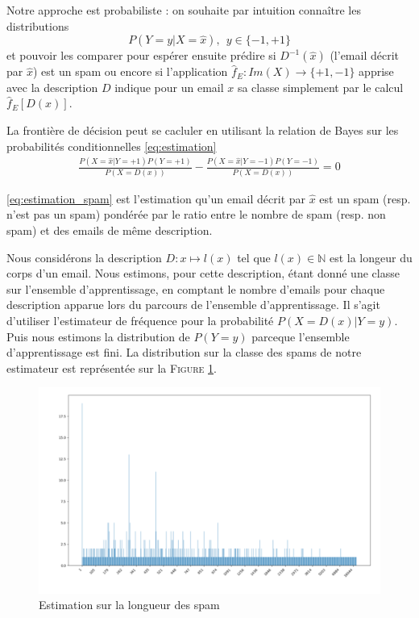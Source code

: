 \documentclass[a4paper, french]{article}
\begin{document}
Notre approche est probabiliste : on souhaite par intuition conna\^itre les distributions 
\label{eq:estimation}
\begin{equation}P(Y=y|X=\hat{x}),\ \ y\in\{-1,+1\}\end{equation}
et pouvoir les comparer pour esp\'erer ensuite pr\'edire si $D^{-1}(\hat{x})$ (l'email d\'ecrit par $\hat{x}$) est un spam ou encore si l'application $\hat{f}_E\colon Im(X)\rightarrow \{+1,-1\}$ apprise avec la description $D$ indique pour un email $x$ sa classe simplement par le calcul $\hat{f}_E[ D(x)]$.

La fronti\`ere de d\'ecision peut se cacluler en utilisant la relation de Bayes sur les probabilit\'es conditionnelles \eqref{eq:estimation}
\begin{align}
\label{eq:estimation_spam}
\frac{P(X=\hat{x}|Y=+1)P(Y=+1)}{P(X=D(x))}
- \frac{P(X=\hat{x}|Y=-1)P(Y=-1)}{P(X=D(x))}=0
\end{align}

\eqref{eq:estimation_spam} est l'estimation qu'un email d\'ecrit par $\hat{x}$ est un spam (resp. n'est pas un spam) pond\'er\'ee par le ratio entre le nombre de spam (resp. non spam) et des emails de m\^eme description.

Nous consid\'erons la description $D\colon x\mapsto l(x)$ 
tel que $l(x)\in \mathbb{N}$ est la longeur du corps d'un email. 
Nous estimons, pour cette description, \'etant donn\'e une classe 
sur l'ensemble d'apprentissage, en comptant le nombre d'emails 
pour chaque description apparue lors du parcours de l'ensemble d'apprentissage. 
Il s'agit d'utiliser l'estimateur de fr\'equence pour la probabilit\'e 
$P(X=D(x)|Y=y)$. Puis nous estimons la distribution de $P(Y=y)$ parceque 
l'ensemble d'apprentissage est fini. 
La distribution sur la classe des spams de notre estimateur est 
repr\'esent\'ee sur la F\textsc{igure} \ref{fig:histo1spam}.

\begin{figure}[h!]
\begin{center}
    \caption{Estimation sur la longueur des spam}
    \includegraphics[width=13cm]{histo}
\end{center}
\label{fig:histo1spam}
\end{figure}

\end{document}
